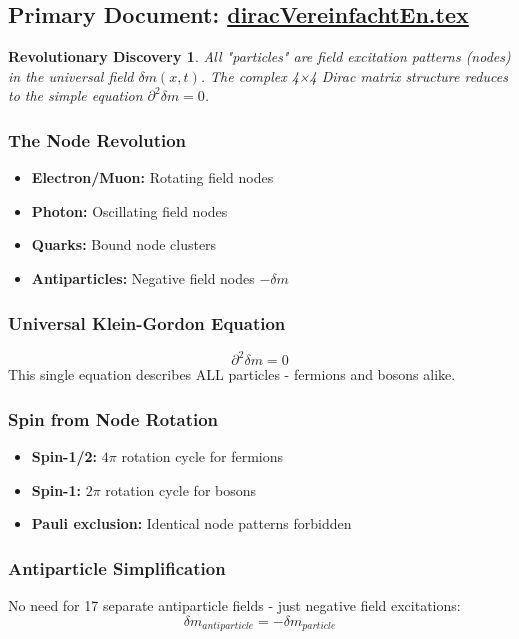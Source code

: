 \documentclass[12pt,a4paper]{report}
\newtheorem{discovery}{Revolutionary Discovery}[chapter]
\begin{document}
	\subsection{Primary Document: \href{https://github.com/jpascher/T0-Time-Mass-Duality/tree/main/2/pdf/diracVereinfachtEn.pdf}{diracVereinfachtEn.tex}}
	
	\begin{discovery}
		All "particles" are field excitation patterns (nodes) in the universal field $\delta m(x,t)$. The complex 4×4 Dirac matrix structure reduces to the simple equation $\partial^2 \delta m = 0$.
	\end{discovery}
	
	\subsubsection{The Node Revolution}
	\begin{itemize}
		\item \textbf{Electron/Muon:} Rotating field nodes
		\item \textbf{Photon:} Oscillating field nodes
		\item \textbf{Quarks:} Bound node clusters
		\item \textbf{Antiparticles:} Negative field nodes $-\delta m$
	\end{itemize}
	
	\subsubsection{Universal Klein-Gordon Equation}
	$$\partial^2 \delta m = 0$$
	This single equation describes ALL particles - fermions and bosons alike.
	
	\subsubsection{Spin from Node Rotation}
	\begin{itemize}
		\item \textbf{Spin-1/2:} $4\pi$ rotation cycle for fermions
		\item \textbf{Spin-1:} $2\pi$ rotation cycle for bosons
		\item \textbf{Pauli exclusion:} Identical node patterns forbidden
	\end{itemize}
	
	\subsubsection{Antiparticle Simplification}
	No need for 17 separate antiparticle fields - just negative field excitations:
	$$\delta m_{antiparticle} = -\delta m_{particle}$$
	
\end{document}

